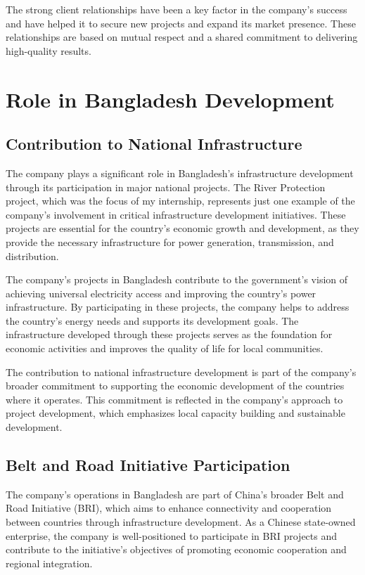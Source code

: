 The strong client relationships have been a key factor in the company's success and have helped it to secure new projects and expand its market presence. These relationships are based on mutual respect and a shared commitment to delivering high-quality results.

\section{Role in Bangladesh Development}

\subsection{Contribution to National Infrastructure}
The company plays a significant role in Bangladesh's infrastructure development through its participation in major national projects. The River Protection project, which was the focus of my internship, represents just one example of the company's involvement in critical infrastructure development initiatives. These projects are essential for the country's economic growth and development, as they provide the necessary infrastructure for power generation, transmission, and distribution.

The company's projects in Bangladesh contribute to the government's vision of achieving universal electricity access and improving the country's power infrastructure. By participating in these projects, the company helps to address the country's energy needs and supports its development goals. The infrastructure developed through these projects serves as the foundation for economic activities and improves the quality of life for local communities.

The contribution to national infrastructure development is part of the company's broader commitment to supporting the economic development of the countries where it operates. This commitment is reflected in the company's approach to project development, which emphasizes local capacity building and sustainable development.

\subsection{Belt and Road Initiative Participation}
The company's operations in Bangladesh are part of China's broader Belt and Road Initiative (BRI), which aims to enhance connectivity and cooperation between countries through infrastructure development. As a Chinese state-owned enterprise, the company is well-positioned to participate in BRI projects and contribute to the initiative's objectives of promoting economic cooperation and regional integration.

